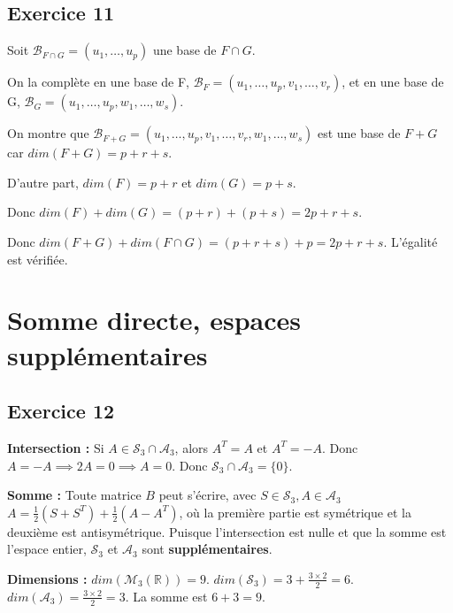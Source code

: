 \documentclass[french]{yLectureNote}
\begin{document}
\subsection{Exercice 11}
Soit $\mathcal{B}_{F\cap G}=(u_1, \dots, u_p)$ une base de $F\cap G$.

On la complète en une base de F, $\mathcal{B}_F=(u_1,\dots,u_p,v_1,\dots,v_r)$, et en une base de G, $\mathcal{B}_G=(u_1,\dots,u_p,w_1,\dots,w_s)$.

On montre que $\mathcal{B}_{F+G}=(u_1,\dots,u_p,v_1,\dots,v_r,w_1,\dots,w_s)$ est une base de $F+G$ car
$dim(F+G)=p+r+s$.

D'autre part, $dim(F)=p+r$ et $dim(G)=p+s$.


Donc $dim(F)+dim(G)=(p+r)+(p+s)=2p+r+s$.

Donc
$dim(F+G)+dim(F\cap G)=(p+r+s)+p=2p+r+s$. L'égalité est vérifiée.

\section{Somme directe, espaces supplémentaires}

\subsection{Exercice 12}
\textbf{Intersection :} Si $A \in \mathcal{S}_3 \cap \mathcal{A}_3$, alors $A^T=A$ et $A^T=-A$. Donc $A=-A \implies 2A=0 \implies A=0$. Donc $\mathcal{S}_3 \cap \mathcal{A}_3 = \{0\}$.

\textbf{Somme :} Toute matrice $B$ peut s'écrire, avec \(S\in \mathcal{S}_3, A\in \mathcal{A}_3 \) $A = \frac{1}{2}(S+S^T) + \frac{1}{2}(A-A^T)$, où la première partie est symétrique et la deuxième est antisymétrique.
Puisque l'intersection est nulle et que la somme est l'espace entier, $\mathcal{S}_{3}$ et $\mathcal{A}_{3}$ sont \textbf{supplémentaires}.

\textbf{Dimensions :} $dim(\mathcal{M}_3(\mathbb{R}))=9$. $dim(\mathcal{S}_3)=3+\frac{3\times2}{2}=6$. $dim(\mathcal{A}_3)=\frac{3\times2}{2}=3$. La somme est $6+3=9$.
\end{document}
